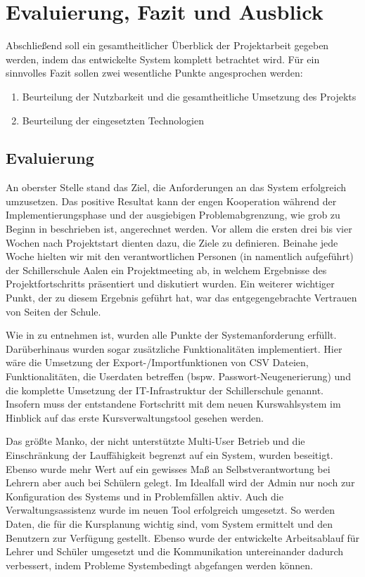 \section{Evaluierung, Fazit und Ausblick}\label{sec:Fazit und Ausblick}

Abschließend soll ein gesamtheitlicher Überblick der Projektarbeit gegeben werden, indem das entwickelte System komplett betrachtet wird.
Für ein sinnvolles Fazit sollen zwei wesentliche Punkte angesprochen werden:
\begin{enumerate}
  \item Beurteilung der Nutzbarkeit und die gesamtheitliche Umsetzung des Projekts
  \item Beurteilung der eingesetzten Technologien
\end{enumerate}

\subsection{Evaluierung}

An oberster Stelle stand das Ziel, die Anforderungen an das System erfolgreich umzusetzen.
Das positive Resultat kann der engen Kooperation während der Implementierungsphase und der ausgiebigen Problemabgrenzung, wie grob zu Beginn in  beschrieben ist, angerechnet werden.
Vor allem die ersten drei bis vier Wochen nach Projektstart dienten dazu, die Ziele zu definieren. Beinahe jede Woche hielten wir mit den verantwortlichen Personen (in  namentlich aufgeführt) der Schillerschule Aalen ein Projektmeeting ab, in welchem Ergebnisse des Projektfortschritts präsentiert und diskutiert wurden.
Ein weiterer wichtiger Punkt, der zu diesem Ergebnis geführt hat, war das entgegengebrachte Vertrauen von Seiten der Schule.

Wie in  zu entnehmen ist, wurden alle Punkte der Systemanforderung erfüllt. Darüberhinaus wurden sogar zusätzliche Funktionalitäten implementiert.
Hier wäre die Umsetzung der Export-/Importfunktionen von CSV Dateien, Funktionalitäten, die Userdaten betreffen (bspw. Passwort-Neugenerierung) und die komplette Umsetzung der \ac{IT}-Infrastruktur der Schillerschule genannt. 
Insofern muss der entstandene Fortschritt mit dem neuen Kurswahlsystem im Hinblick auf das erste Kursverwaltungstool gesehen werden.

Das größte Manko, der nicht unterstützte Multi-User Betrieb und die Einschränkung der Lauffähigkeit begrenzt auf ein System, wurden beseitigt. Ebenso wurde mehr Wert auf ein gewisses Maß an Selbstverantwortung bei Lehrern aber auch bei Schülern gelegt.
Im Idealfall wird der Admin nur noch zur Konfiguration des Systems und in Problemfällen aktiv.
Auch die Verwaltungsassistenz wurde im neuen Tool erfolgreich umgesetzt. So werden Daten, die für die Kursplanung wichtig sind, vom System ermittelt und den Benutzern zur Verfügung gestellt. 
Ebenso wurde der entwickelte Arbeitsablauf für Lehrer und Schüler umgesetzt und die Kommunikation untereinander dadurch verbessert, indem Probleme Systembedingt abgefangen werden können.


